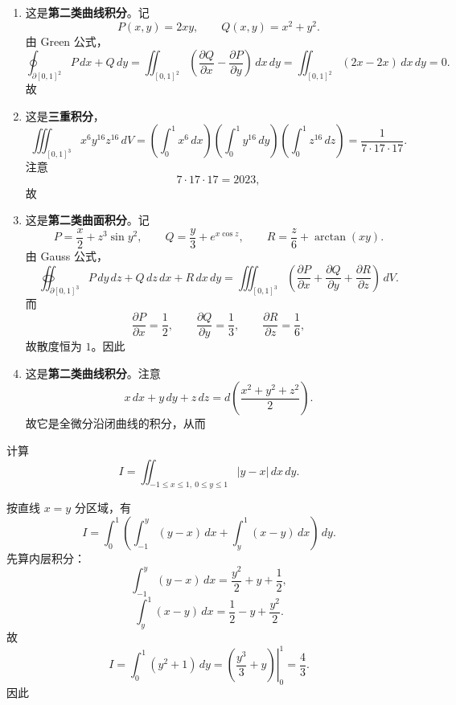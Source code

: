 \begin{question}[指出积分类型并计算]
\begin{solution}
\begin{enumerate}[label=(\arabic*),leftmargin=2.6em,itemsep=0.25em,topsep=0.2em]
\item 这是\textbf{第二类曲线积分}。记
\[
P(x,y)=2xy,\qquad Q(x,y)=x^2+y^2.
\]
由 Green 公式，
\[
\oint_{\partial[0,1]^2}P\,dx+Q\,dy
=\iint_{[0,1]^2}\left(\frac{\partial Q}{\partial x}-\frac{\partial P}{\partial y}\right)\,dx\,dy
=\iint_{[0,1]^2}(2x-2x)\,dx\,dy=0.
\]
故

\item 这是\textbf{三重积分}，
\[
\iiint_{[0,1]^3}x^6y^{16}z^{16}\,dV
=\left(\int_0^1 x^6\,dx\right)\left(\int_0^1 y^{16}\,dy\right)\left(\int_0^1 z^{16}\,dz\right)
=\frac{1}{7\cdot17\cdot17}.
\]
注意
\[
7\cdot17\cdot17=2023,
\]
故

\item 这是\textbf{第二类曲面积分}。记
\[
P=\frac{x}{2}+z^3\sin y^2,\qquad
Q=\frac{y}{3}+e^{x\cos z},\qquad
R=\frac{z}{6}+\arctan(xy).
\]
由 Gauss 公式，
\[
\oiint_{\partial[0,1]^3}P\,dy\,dz+Q\,dz\,dx+R\,dx\,dy
=\iiint_{[0,1]^3}\left(\frac{\partial P}{\partial x}+\frac{\partial Q}{\partial y}+\frac{\partial R}{\partial z}\right)\,dV.
\]
而
\[
\frac{\partial P}{\partial x}=\frac12,\qquad
\frac{\partial Q}{\partial y}=\frac13,\qquad
\frac{\partial R}{\partial z}=\frac16,
\]
故散度恒为 $1$。因此

\item 这是\textbf{第二类曲线积分}。注意
\[
x\,dx+y\,dy+z\,dz=d\!\left(\frac{x^2+y^2+z^2}{2}\right).
\]
故它是全微分沿闭曲线的积分，从而
\end{enumerate}
\end{solution}
\end{question}

\begin{question}[二重积分]

计算
\[
I=\iint_{-1\le x\le1,\ 0\le y\le1}|y-x|\,dx\,dy.
\]

\begin{solution}
按直线 $x=y$ 分区域，有
\[
I=\int_0^1\left(\int_{-1}^y (y-x)\,dx+\int_y^1 (x-y)\,dx\right)\,dy.
\]
先算内层积分：
\[
\int_{-1}^y (y-x)\,dx=\frac{y^2}{2}+y+\frac12,
\]
\[
\int_y^1 (x-y)\,dx=\frac12-y+\frac{y^2}{2}.
\]
故
\[
I=\int_0^1 (y^2+1)\,dy
=\left.\left(\frac{y^3}{3}+y\right)\right|_0^1
=\frac43.
\]
因此
\end{solution}
\end{question}

